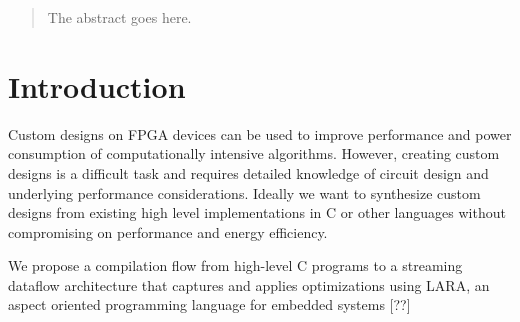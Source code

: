 \documentclass[conference]{IEEEtran}
\begin{document}




\maketitle


\begin{abstract}
The abstract goes here.
\end{abstract}





%
\IEEEpeerreviewmaketitle



\section{Introduction}

 Custom designs on FPGA devices can be used to improve performance and
power consumption of computationally intensive algorithms. However,
creating custom designs is a difficult task and requires detailed
knowledge of circuit design and underlying performance
considerations. Ideally we want to synthesize custom designs from
existing high level implementations in C or other languages without
compromising on performance and energy efficiency.

We propose a compilation flow from high-level C programs to a
streaming dataflow architecture that captures and applies
optimizations using LARA, an aspect oriented programming language for
embedded systems [??]
\end{document}
